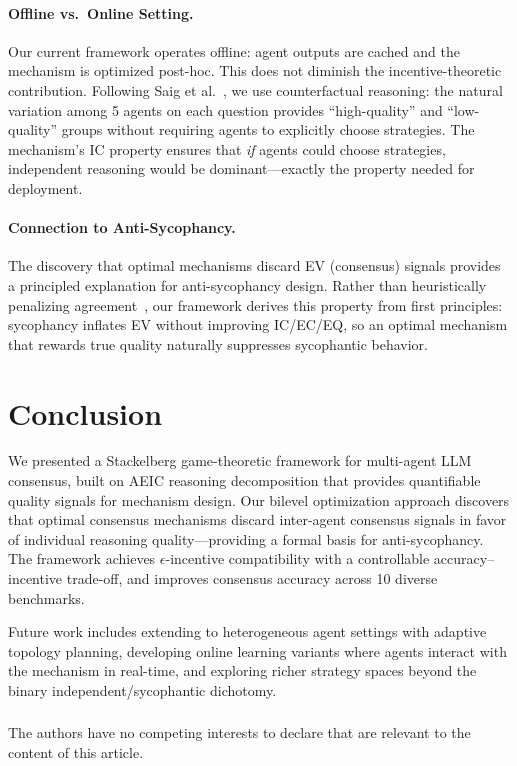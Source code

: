 \documentclass[runningheads]{llncs}
\begin{document}
\paragraph{Offline vs.\ Online Setting.}
Our current framework operates offline: agent outputs are cached and the mechanism is optimized post-hoc. This does not diminish the incentive-theoretic contribution. Following Saig et al.~\cite{saig2024incentivizing}, we use counterfactual reasoning: the natural variation among 5 agents on each question provides ``high-quality'' and ``low-quality'' groups without requiring agents to explicitly choose strategies. The mechanism's IC property ensures that \emph{if} agents could choose strategies, independent reasoning would be dominant---exactly the property needed for deployment.

\paragraph{Connection to Anti-Sycophancy.}
The discovery that optimal mechanisms discard EV (consensus) signals provides a principled explanation for anti-sycophancy design. Rather than heuristically penalizing agreement~\cite{pitre2025consensagent}, our framework derives this property from first principles: sycophancy inflates EV without improving IC/EC/EQ, so an optimal mechanism that rewards true quality naturally suppresses sycophantic behavior.

\section{Conclusion}
\label{sec:conclusion}

We presented a Stackelberg game-theoretic framework for multi-agent LLM consensus, built on AEIC reasoning decomposition that provides quantifiable quality signals for mechanism design. Our bilevel optimization approach discovers that optimal consensus mechanisms discard inter-agent consensus signals in favor of individual reasoning quality---providing a formal basis for anti-sycophancy. The framework achieves $\epsilon$-incentive compatibility with a controllable accuracy--incentive trade-off, and improves consensus accuracy across 10 diverse benchmarks.

Future work includes extending to heterogeneous agent settings with adaptive topology planning, developing online learning variants where agents interact with the mechanism in real-time, and exploring richer strategy spaces beyond the binary independent/sycophantic dichotomy.

\begin{credits}
\subsubsection{\discintname}
The authors have no competing interests to declare that are relevant to the content of this article.
\end{credits}



\end{document}
